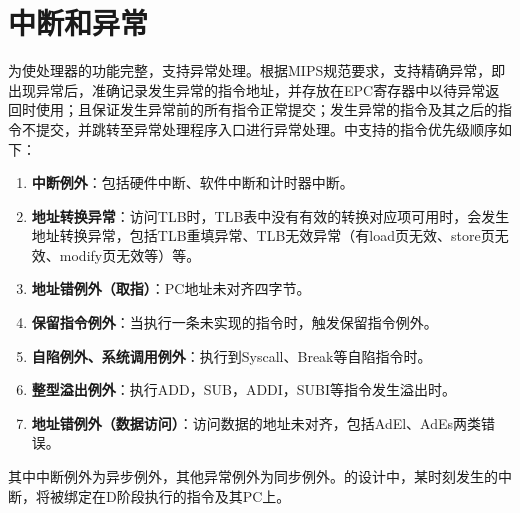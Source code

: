 \section{中断和异常}
为使处理器的功能完整，\cpuname 支持异常处理。根据MIPS规范要求，\cpuname 支持精确异常，即出现异常后，准确记录发生异常的指令地址，并存放在EPC寄存器中以待异常返回时使用；且保证发生异常前的所有指令正常提交；发生异常的指令及其之后的指令不提交，并跳转至异常处理程序入口进行异常处理。\cpuname 中支持的指令优先级顺序如下：

\begin{enumerate}
    \item \textbf{中断例外}：包括硬件中断、软件中断和计时器中断。
    \item \textbf{地址转换异常}：访问TLB时，TLB表中没有有效的转换对应项可用时，会发生地址转换异常，包括TLB重填异常、TLB无效异常（有load页无效、store页无效、modify页无效等）等。
    \item \textbf{地址错例外（取指）}：PC地址未对齐四字节。
    \item \textbf{保留指令例外}：当执行一条未实现的指令时，触发保留指令例外。
    \item \textbf{自陷例外、系统调用例外}：执行到Syscall、Break等自陷指令时。
    \item \textbf{整型溢出例外}：执行ADD，SUB，ADDI，SUBI等指令发生溢出时。
    \item \textbf{地址错例外（数据访问）}：访问数据的地址未对齐，包括AdEl、AdEs两类错误。
\end{enumerate}

其中中断例外为异步例外，其他异常例外为同步例外。\cpuname 的设计中，某时刻发生的中断，将被绑定在D阶段执行的指令及其PC上。